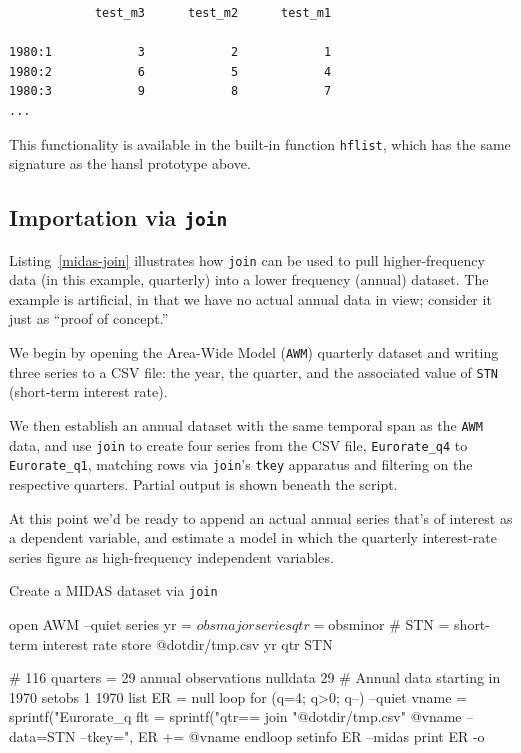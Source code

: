 \documentclass{article}
\begin{document}
{
\small
\begin{verbatim}
            test_m3      test_m2      test_m1

1980:1            3            2            1
1980:2            6            5            4
1980:3            9            8            7
...
\end{verbatim}
}

This functionality is available in the built-in function
\texttt{hflist}, which has the same signature as the hansl prototype
above.

\subsection*{Importation via \texttt{join}}

Listing~\ref{midas-join} illustrates how \texttt{join} can be used to
pull higher-frequency data (in this example, quarterly) into a lower
frequency (annual) dataset. The example is artificial, in that we have
no actual annual data in view; consider it just as ``proof of
concept.''

We begin by opening the Area-Wide Model (\texttt{AWM}) quarterly
dataset and writing three series to a CSV file: the year, the
quarter, and the associated value of \texttt{STN} (short-term interest
rate).

We then establish an annual dataset with the same temporal span as the
\texttt{AWM} data, and use \texttt{join} to create four series from
the CSV file, \texttt{Eurorate\_q4} to \texttt{Eurorate\_q1}, matching
rows via \texttt{join}'s \texttt{tkey} apparatus and filtering on the
respective quarters. Partial output is shown beneath the script.

At this point we'd be ready to append an actual annual series that's
of interest as a dependent variable, and estimate a model in which the
quarterly interest-rate series figure as high-frequency independent
variables.

\begin{script}[htbp]
  \caption{Create a MIDAS dataset via \texttt{join}}
  \label{midas-join}
\begin{scode}
open AWM --quiet
series yr = $obsmajor
series qtr = $obsminor
# STN = short-term interest rate
store @dotdir/tmp.csv yr qtr STN

# 116 quarters = 29 annual observations
nulldata 29
# Annual data starting in 1970
setobs 1 1970
list ER = null
loop for (q=4; q>0; q--) --quiet
  vname = sprintf("Eurorate_q%
  flt = sprintf("qtr==%
  join "@dotdir/tmp.csv" @vname --data=STN --tkey=",%
  ER += @vname
endloop
setinfo ER --midas
print ER -o
\end{scode}
\end{script}
\end{document}
